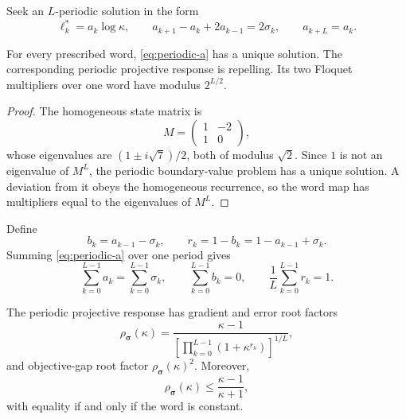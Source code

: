 \documentclass[letterpaper,twoside]{article}
\begin{document}
Seek an $L$-periodic solution in the form
\begin{equation}\label{eq:periodic-a}
 \ell_k^*=a_k\log\kappa,
 \qquad
 a_{k+1}-a_k+2a_{k-1}=2\sigma_k,
 \qquad a_{k+L}=a_k.
\end{equation}

\begin{proposition}\label{prop:periodic-response}
For every prescribed word, \eqref{eq:periodic-a} has a unique solution.  The
corresponding periodic projective response is repelling.  Its two Floquet
multipliers over one word have modulus $2^{L/2}$.
\end{proposition}

\begin{proof}
The homogeneous state matrix is
\[
 M=\begin{pmatrix}1&-2\\1&0\end{pmatrix},
\]
whose eigenvalues are $(1\pm i\sqrt7)/2$, both of modulus $\sqrt2$.  Since
$1$ is not an eigenvalue of $M^L$, the periodic boundary-value problem has a
unique solution.  A deviation from it obeys the homogeneous recurrence, so
the word map has multipliers equal to the eigenvalues of $M^L$.
\end{proof}

Define
\begin{equation}\label{eq:r-def}
 b_k=a_{k-1}-\sigma_k,
 \qquad r_k=1-b_k=1-a_{k-1}+\sigma_k.
\end{equation}
Summing \eqref{eq:periodic-a} over one period gives
\begin{equation}\label{eq:r-mean}
 \sum_{k=0}^{L-1}a_k=\sum_{k=0}^{L-1}\sigma_k,
 \qquad
 \sum_{k=0}^{L-1}b_k=0,
 \qquad
 \frac1L\sum_{k=0}^{L-1}r_k=1.
\end{equation}

\begin{theorem}\label{thm:exact-word-factor}
The periodic projective response has gradient and error root factors
\begin{equation}\label{eq:exact-word-factor}
 \rho_{\bm\sigma}(\kappa)
 =\frac{\kappa-1}
 {\left[\prod_{k=0}^{L-1}(1+\kappa^{r_k})\right]^{1/L}},
\end{equation}
and objective-gap root factor $\rho_{\bm\sigma}(\kappa)^2$.  Moreover,
\begin{equation}\label{eq:jensen-strict}
 \rho_{\bm\sigma}(\kappa)
 \le\frac{\kappa-1}{\kappa+1},
\end{equation}
with equality if and only if the word is constant.
\end{theorem}
\end{document}
